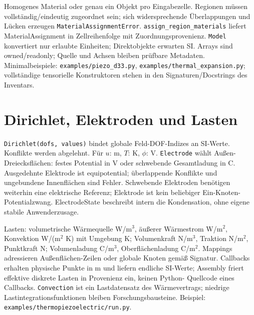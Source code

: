 Homogenes Material oder genau ein Objekt pro Eingabezelle. Regionen müssen
vollständig/eindeutig zugeordnet sein; sich widersprechende Überlappungen und
Lücken erzeugen \texttt{MaterialAssignmentError}. \texttt{assign\_region\_materials}
liefert MaterialAssignment in Zellreihenfolge mit Zuordnungsprovenienz.
\texttt{Model} konvertiert nur erlaubte Einheiten; Direktobjekte erwarten SI.
Arrays sind owned/readonly; Quelle und Achsen bleiben prüfbare Metadaten.
Minimalbeispiele: \nolinkurl{examples/piezo_d33.py},
\nolinkurl{examples/thermal_expansion.py}; vollständige tensorielle
Konstruktoren stehen in den Signaturen/Docstrings des Inventars.

\section{Dirichlet, Elektroden und Lasten}
\texttt{Dirichlet(dofs, values)} bindet globale Feld-DOF-Indizes an SI-Werte.
Konflikte werden abgelehnt. Für $u$: m, $T$: K, $\phi$: V.
\texttt{Electrode} wählt Außen-Dreiecksflächen: festes Potential in V oder
schwebende Gesamtladung in C. Ausgedehnte Elektrode ist equipotential;
überlappende Konflikte und ungebundene Innenflächen sind Fehler. Schwebende
Elektroden benötigen weiterhin eine elektrische Referenz; Elektrode ist
kein beliebiger Ein-Knoten-Potentialzwang. ElectrodeState beschreibt
intern die Kondensation, ohne eigene stabile Anwenderzusage.

Lasten: volumetrische Wärmequelle W/m$^3$, äußerer Wärmestrom W/m$^2$,
Konvektion W/(m$^2$ K) mit Umgebung K; Volumenkraft N/m$^3$, Traktion N/m$^2$,
Punktkraft N; Volumenladung C/m$^3$, Oberflächenladung C/m$^2$.
Mappings adressieren Außenflächen-Zeilen oder globale Knoten gemäß Signatur.
Callbacks erhalten physische Punkte in m und liefern endliche SI-Werte;
Assembly friert effektive diskrete Lasten in Provenienz ein, keinen Python-
Quellcode eines Callbacks. \texttt{Convection} ist ein
Lastdatensatz des Wärmevertrags; niedrige Lastintegrationsfunktionen
bleiben Forschungsbausteine. Beispiel: \nolinkurl{examples/thermopiezoelectric/run.py}.
\endgroup
